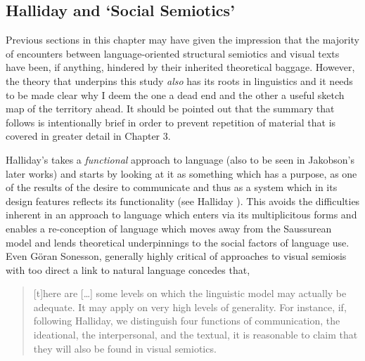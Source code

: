 

\subsection{Halliday and `Social Semiotics'}\label{halliday}
Previous sections in this chapter may have given the impression that the majority of encounters between language-oriented structural semiotics and visual texts have been, if anything, hindered by their inherited theoretical baggage. However, the theory that underpins this study \textit{also} has its roots in linguistics and it needs to be made clear why I deem the one a dead end and the other a useful sketch map of the territory ahead. It should be pointed out that the summary that follows is intentionally  brief in order to prevent repetition of material that is covered in greater detail in Chapter 3. 

Halliday's takes a \textit{functional }approach to language (also to be seen in Jakobson's later works) and starts by looking at it as something which has a purpose, as one of the results of the desire to communicate and thus as a system which in its design features reflects its functionality (see Halliday  \citeyear{Halliday:1973,Halliday:1978,Halliday:2004}). This avoids the difficulties inherent in an approach to language which enters via its multiplicitous forms and enables a re-conception of language which moves away from the Saussurean model and lends theoretical underpinnings to the social factors of language use. Even G\"{o}ran Sonesson, generally highly critical of approaches to visual semiosis with too direct a link to natural language concedes that, 

\begin{quote}
[t]here are [\ldots] some levels on which the linguistic model may actually be adequate. It may apply on very high levels of generality. For instance, if, following Halliday, we distinguish four functions of communication, the ideational, the interpersonal, and the textual, it is reasonable to claim that they will also be found in visual semiotics. \citep{Sonesson:1996}
\end{quote}

